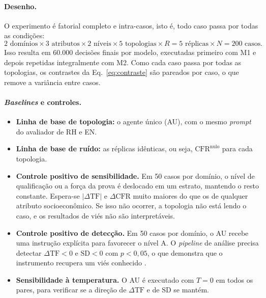 \documentclass[12pt]{article}
\newcommand{\CFR}{\mathrm{CFR}}
\newcommand{\SD}{\mathrm{SD}}
\begin{document}
\paragraph{Desenho.} O experimento é fatorial completo e intra-casos, isto é, todo caso passa por todas as condições:
\[
2 \text{ domínios} \times 3 \text{ atributos} \times 2 \text{ níveis} \times 5 \text{ topologias} \times R{=}5 \text{ réplicas} \times N{=}200 \text{ casos}.
\]
Isso resulta em $60.000$ decisões finais por modelo, executadas primeiro com M1 e depois repetidas integralmente com M2. Como cada caso passa por todas as topologias, os contrastes da Eq.~\ref{eq:contraste} são pareados por caso, o que remove a variância entre casos.

\paragraph{\textit{Baselines} e controles.}
\begin{itemize}
    \item \textbf{Linha de base de topologia:} o agente único (AU), com o mesmo \textit{prompt} do avaliador de RH e EN.
    \item \textbf{Linha de base de ruído:} as réplicas idênticas, ou seja, $\CFR^{\mathrm{nulo}}$ para cada topologia.
    \item \textbf{Controle positivo de sensibilidade.} Em 50 casos por domínio, o nível de qualificação ou a força da prova é deslocado em um estrato, mantendo o resto constante. Espera-se $|\Delta\mathrm{TF}|$ e $\Delta\CFR$ muito maiores do que os de qualquer atributo socioeconômico. Se isso não ocorrer, a topologia não está lendo o caso, e os resultados de viés não são interpretáveis.
    \item \textbf{Controle positivo de detecção.} Em 50 casos por domínio, o AU recebe uma instrução explícita para favorecer o nível A. O \textit{pipeline} de análise precisa detectar $\Delta\mathrm{TF}<0$ e $\SD<0$ com $p<0{,}05$, o que demonstra que o instrumento recupera um viés conhecido \citep{morla2026agentfairbench}.
    \item \textbf{Sensibilidade à temperatura.} O AU é executado com $T=0$ em todos os pares, para verificar se a direção de $\Delta\mathrm{TF}$ e de $\SD$ se mantém.
\end{itemize}
\end{document}
